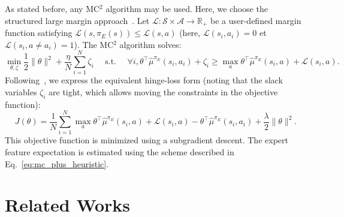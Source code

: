 \documentclass[english,utf8]{./hermes-journal}
\newcommand{\s}{\mathcal{S}}
\newcommand{\A}{\mathcal{A}}
\newcommand{\lc}{\mathcal{L}}
\begin{document}
As stated before, any MC$^2$ algorithm may be used. Here, we choose
the structured large margin approach~\cite{Taskar:2005}. Let
$\lc:\s\times\A\rightarrow\mathbb{R}_+$ be a user-defined margin
function satisfying $\lc(s,\pi_E(s))\leq \lc(s,a)$ (here,
$\lc(s_i,a_i)=0$ et $\lc(s_i,a\neq a_i)=1$). The MC$^2$ algorithm
solves:%
\begin{equation}
  \min_{\theta,\zeta}\frac{1}{2}\|\theta\|^2 +
  \frac{\eta}{N}\sum_{i=1}^N \zeta_i \text{~~~~s.t.~~~~} \forall i,
  \theta^\top\hat{\mu}^{\pi_E}(s_i,a_i)+\zeta_i \geq \max_a \theta^\top
  \hat{\mu}^{\pi_E}(s_i,a) + \lc(s_i,a). \label{eq:qp_taskar}
\end{equation}
Following~\cite{Ratliff:2006}, we express the equivalent hinge-loss
form (noting that the slack variables $\zeta_i$ are tight, which
allows moving the constraints in the objective function):
\begin{equation}
  J(\theta) = \frac{1}{N}\sum_{i=1}^N \max_a \theta^\top
  \hat{\mu}^{\pi_E}(s_i,a) + \lc(s_i,a) -
  \theta^\top\hat{\mu}^{\pi_E}(s_i,a_i) +
  \frac{\lambda}{2}\|\theta\|^2.
\end{equation}
This objective function is minimized using a subgradient descent.
The expert feature expectation is estimated using the scheme
described in Eq.~\eqref{eq:mc_plus_heuristic}.


\section{Related Works}
\label{sec:relatedWorks}
\end{document}
